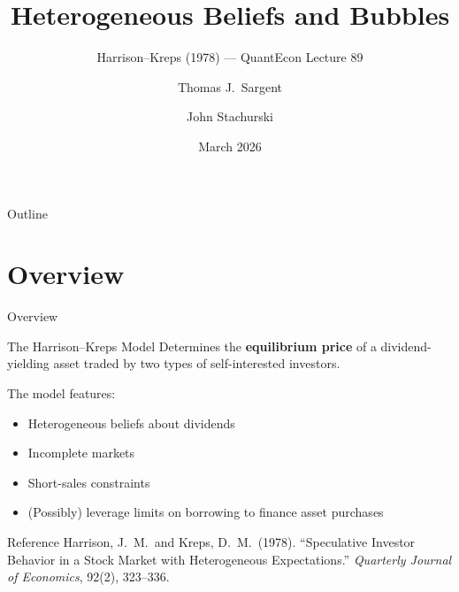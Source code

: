 \documentclass[aspectratio=169]{beamer}
\title[Heterogeneous Beliefs \& Bubbles]{Heterogeneous Beliefs and Bubbles}
\subtitle{Harrison--Kreps (1978) --- QuantEcon Lecture 89}
\author{Thomas J.\ Sargent \and John Stachurski}
\institute{QuantEcon}
\date{March 2026}
\begin{document}

\begin{frame}
  \titlepage
\end{frame}

\begin{frame}{Outline}
  \tableofcontents
\end{frame}

\section{Overview}

\begin{frame}{Overview}
  \begin{block}{The Harrison--Kreps Model}
    Determines the \textbf{equilibrium price} of a dividend-yielding asset
    traded by two types of self-interested investors.
  \end{block}

  \medskip
  The model features:
  \begin{itemize}
    \item Heterogeneous beliefs about dividends
    \item Incomplete markets
    \item Short-sales constraints
    \item (Possibly) leverage limits on borrowing to finance asset purchases
  \end{itemize}

  \medskip
  \begin{block}{Reference}
    Harrison, J.~M.\ and Kreps, D.~M.\ (1978).
    ``Speculative Investor Behavior in a Stock Market with Heterogeneous
    Expectations.''
    \emph{Quarterly Journal of Economics}, 92(2), 323--336.
  \end{block}
\end{frame}
\end{document}
